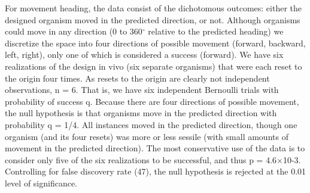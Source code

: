 For movement heading, the data consist of the dichotomous outcomes: either the designed organism moved in the predicted direction, or not. Although organisms could move in any direction (0 to 360{$^{\circ}$} relative to the predicted heading) we discretize the space into four directions of possible movement (forward, backward, left, right), only one of which is considered a success (forward). We have six realizations of the design in vivo (six separate organisms) that were each reset to the origin four times. As resets to the origin are clearly not independent observations, n = 6. That is, we have six independent Bernoulli trials with probability of success q. Because there are four directions of possible movement, the null hypothesis is that organisms move in the predicted direction with probability q = 1/4. All instances moved in the predicted direction, though one organism (and its four resets) was more or less sessile (with small amounts of movement in the predicted direction). The most conservative use of the data is to consider only five of the six realizations to be successful, and thus p = 4.6{$\times$}10-3. Controlling for false discovery rate (47), the null hypothesis is rejected at the 0.01 level of significance.

